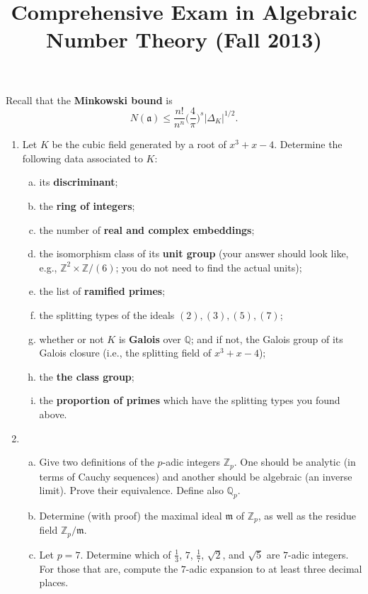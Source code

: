 \documentclass[12pt]{amsart}
\title{Comprehensive Exam in Algebraic Number Theory (Fall 2013)}
\begin{document}
\maketitle

Recall that the {\bf Minkowski bound} is
\[
N(\mathfrak{a}) \leq \frac{n!}{n^n} \bigg(\frac{4}{\pi}\bigg)^s |\Delta_K|^{1/2}.
\]

\begin{enumerate}[1.]
\item
Let $K$ be the cubic field generated by a root of $x^3 + x - 4$. Determine the
following data associated to $K$:
\begin{enumerate}[(a)]
\item its {\bf discriminant};
\item the {\bf ring of integers};
\item the number of {\bf real and complex embeddings};
\item the isomorphism class of its {\bf unit group} (your answer should look like,
e.g., $\mathbb{Z}^2 \times \mathbb{Z}/(6)$; you do not need to find the actual units);
\item the list of {\bf ramified primes};
\item the splitting types of the ideals $(2), (3), (5), (7)$;
\item whether or not $K$ is {\bf Galois} over $\mathbb{Q}$; and if not, the Galois group
of its Galois closure (i.e., the splitting field of $x^3 + x - 4$);
\item the {\bf the class group};
\item the {\bf proportion of primes} which have the splitting types you found above.
\end{enumerate}
\vskip 0.5cm
\item
\begin{enumerate}[(a)]
\item Give two definitions of the $p$-adic integers $\mathbb{Z}_p$. One should be analytic
(in terms of Cauchy sequences) and another should be algebraic (an inverse limit). Prove their equivalence.
Define also $\mathbb{Q}_p$.
\item Determine (with proof) the maximal ideal $\mathfrak{m}$ of $\mathbb{Z}_p$, as well as the 
residue field $\mathbb{Z}_p / \mathfrak{m}$.
\item Let $p = 7$. Determine which of $\frac{1}{3}$, $7$, $\frac{1}{7}$, $\sqrt{2}$,
and $\sqrt{5}$ are $7$-adic integers. For those that are, compute the $7$-adic expansion
to at least three decimal places. 


\end{enumerate}
\end{enumerate}
\end{document}
